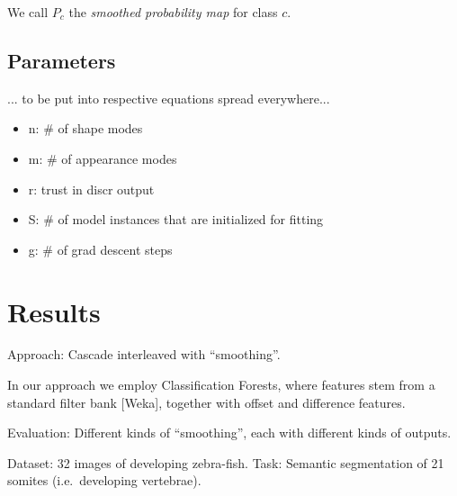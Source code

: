 \documentclass[10pt,twocolumn,letterpaper]{article}
\begin{document}
We call $P_c$ the \emph{smoothed probability map} for class $c$. 

\subsection{Parameters}
... to be put into respective equations spread everywhere...
\begin{itemize}
\item n: \# of shape modes
\item m: \# of appearance modes
\item r: trust in discr output
\item S: \# of model instances that are initialized for fitting
\item g: \# of grad descent steps
\end{itemize}

\section{Results}
Approach: Cascade interleaved with "`smoothing"'. 

In our approach we employ Classification Forests, where features stem from a standard filter bank [Weka], together with offset and difference features. 
%

Evaluation: Different kinds of "`smoothing"', each with different kinds of outputs.

Dataset: 32 images of developing zebra-fish. Task: Semantic segmentation of 21 somites (i.e.\ developing vertebrae).
\end{document}
